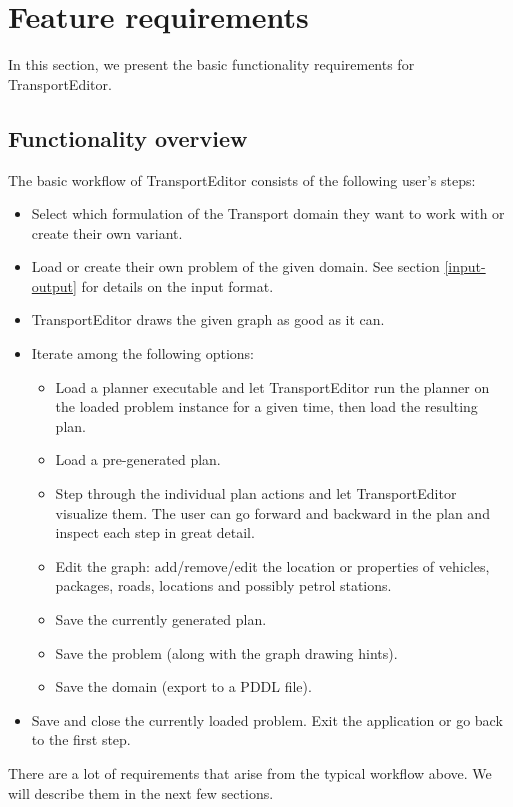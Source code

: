 \documentclass[10pt,a4paper,oneside]{article}
\newcommand{\pname}{TransportEditor} %
\begin{document}
\section{Feature requirements}

In this section, we present the basic functionality requirements for \pname{}.

\subsection{Functionality overview}

The basic workflow of \pname{} consists of the following user's steps:
\begin{itemize}
\item Select which formulation of the Transport domain they want to work with or create their own variant.
\item Load or create their own problem of the given domain. See section \ref{input-output} for details on the input format.
\item \pname{} draws the given graph as good as it can.
\item Iterate among the following options:
\begin{itemize}
\item Load a planner executable and let \pname{} run the planner on the loaded problem instance for a given time, then load the resulting plan.
\item Load a pre-generated plan.
\item Step through the individual plan actions and let \pname{} visualize them.
The user can go forward and backward in the plan and inspect each step in great detail.
\item Edit the graph: add/remove/edit the location or properties of vehicles, packages, roads, locations and possibly petrol stations.
\item Save the currently generated plan.
\item Save the problem (along with the graph drawing hints).
\item Save the domain (export to a PDDL file).
\end{itemize}
\item Save and close the currently loaded problem. Exit the application or go back to the first step.
\end{itemize}

There are a lot of requirements that arise from the typical workflow above. We will describe them in the next few sections.
\end{document}
